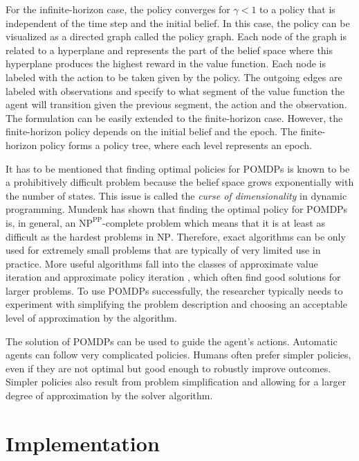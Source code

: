 For the infinite-horizon case, the policy converges for \(\gamma < 1\)
to a policy that is independent of the time step and the initial belief. In this case, the policy can be visualized as
a directed graph called the policy graph. Each node of the graph is related to a hyperplane and represents the part of the belief space
where this hyperplane produces the highest reward in the
value function. Each node is labeled with the action to be taken given by the policy.
The outgoing edges are labeled with observations and specify to what segment of the value function the agent will transition
given the previous segment, the action and the observation.
The formulation can be easily extended to the finite-horizon case. However, the finite-horizon policy depends on the initial belief and the epoch. The finite-horizon policy forms a policy tree, where each level represents an epoch.

It has to be mentioned that finding optimal policies for POMDPs is known to be
a prohibitively difficult problem because the belief space grows exponentially with the number of states.
This issue is called the \emph{curse of dimensionality} in dynamic programming.
Mundenk \citep{Mundhenk2000} has shown that finding the optimal policy for POMDPs is, in general, an
\(\text{NP}^\text{PP}\)-complete problem which means that it is at least as difficult as the hardest
problems in \(\text{NP}\).
Therefore, exact algorithms can be only used for extremely small problems that are typically
of very limited use in practice.
More useful algorithms fall into the classes of approximate value iteration and approximate policy iteration \citep{Cassandra1998, Hauskrecht2000}, which often find good solutions for larger problems.
To use POMDPs successfully,
the researcher typically needs to experiment with simplifying the problem description
and choosing an acceptable level of approximation by the algorithm.

The solution of POMDPs can be used to guide the agent's actions. Automatic agents can follow very complicated
policies. Humans often prefer simpler policies, even if they are not optimal but good enough
to robustly improve outcomes. Simpler policies also result from problem simplification and allowing for a larger degree of approximation by the solver algorithm.

\section{Implementation}\label{implementation}

